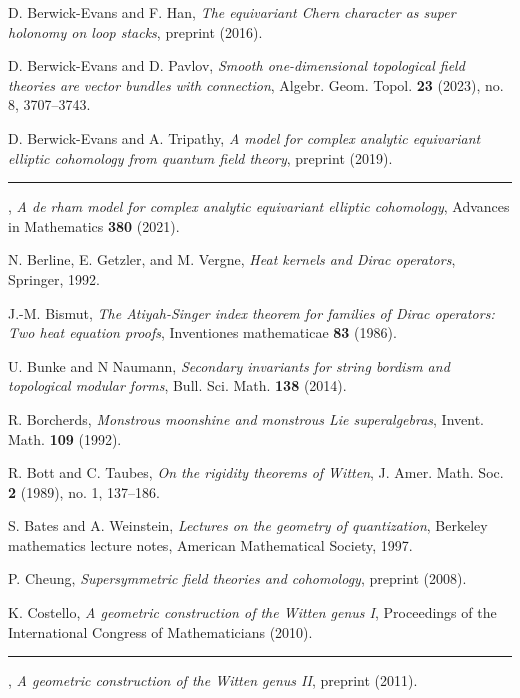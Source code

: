\begin{description}[leftmargin=5.6em,labelwidth=5.2em,labelsep=0.4em,itemsep=0.5ex,parsep=0pt,topsep=0.8ex]
\item[\textbf{[BEH16]}] D. Berwick-Evans and F. Han, \textit{The equivariant Chern character as super holonomy on loop stacks}, preprint (2016).
\item[\textbf{[BEP23]}] D. Berwick-Evans and D. Pavlov, \textit{Smooth one-dimensional topological field theories are vector bundles with connection}, Algebr. Geom. Topol. \textbf{23} (2023), no. 8, 3707--3743.
\item[\textbf{[BET19]}] D. Berwick-Evans and A. Tripathy, \textit{A model for complex analytic equivariant elliptic cohomology from quantum field theory}, preprint (2019).
\item[\textbf{[BET21]}] \rule[0.45ex]{2.6em}{0.45pt}, \textit{A de rham model for complex analytic equivariant elliptic cohomology}, Advances in Mathematics \textbf{380} (2021).
\item[\textbf{[BGV92]}] N. Berline, E. Getzler, and M. Vergne, \textit{Heat kernels and Dirac operators}, Springer, 1992.
\item[\textbf{[Bis86]}] J.-M. Bismut, \textit{The Atiyah-Singer index theorem for families of Dirac operators: Two heat equation proofs}, Inventiones mathematicae \textbf{83} (1986).
\item[\textbf{[BN14]}] U. Bunke and N Naumann, \textit{Secondary invariants for string bordism and topological modular forms}, Bull. Sci. Math. \textbf{138} (2014).
\item[\textbf{[Bor92]}] R. Borcherds, \textit{Monstrous moonshine and monstrous Lie superalgebras}, Invent. Math. \textbf{109} (1992).
\item[\textbf{[BT89]}] R. Bott and C. Taubes, \textit{On the rigidity theorems of Witten}, J. Amer. Math. Soc. \textbf{2} (1989), no. 1, 137--186.
\item[\textbf{[BW97]}] S. Bates and A. Weinstein, \textit{Lectures on the geometry of quantization}, Berkeley mathematics lecture notes, American Mathematical Society, 1997.
\item[\textbf{[Che08]}] P. Cheung, \textit{Supersymmetric field theories and cohomology}, preprint (2008).
\item[\textbf{[Cos10]}] K. Costello, \textit{A geometric construction of the Witten genus I}, Proceedings of the International Congress of Mathematicians (2010).
\item[\textbf{[Cos11]}] \rule[0.45ex]{2.6em}{0.45pt}, \textit{A geometric construction of the Witten genus II}, preprint (2011).

\end{description}

